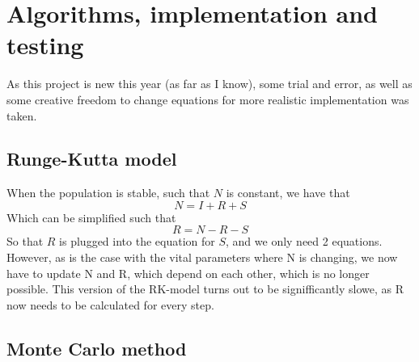 \section{Algorithms, implementation and testing}
As this project is new this year (as far as I know), some trial and error, as well as some creative freedom to change equations for more realistic implementation was taken.



\subsection{Runge-Kutta model}


When the population is stable, such that $N$ is constant, we have that
\begin{equation}
    N=I+R+S
\end{equation}
Which can be simplified such that
$$
R=N-R-S
$$
So that $R$ is plugged into the equation for $S$, and we only need 2 equations. 
However, as is the case with the vital parameters where N is changing, we now have to update N and R, which depend on each other, 
which is no longer possible. This version of the RK-model turns out to be signifficantly slowe, as R now needs to be calculated for every step.

\subsection{Monte Carlo method}




